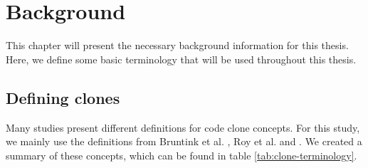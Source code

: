 \chapter{Background}
\label{ch:background}
This chapter will present the necessary background information for this thesis. Here, we define some basic terminology that will be used throughout this thesis.

\section{Defining clones}
Many studies present different definitions for code clone concepts. For this study, we mainly use the definitions from Bruntink et al. \cite{bruntink2005use}, Roy et al. \cite{roy2007survey} and \cite{jiang2007deckard}. We created a summary of these concepts, which can be found in table \ref{tab:clone-terminology}.

